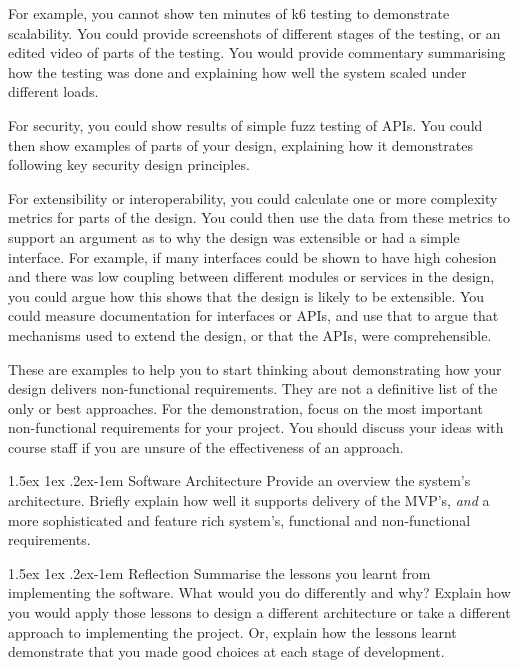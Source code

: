 \documentclass{csse4400}
\makeatletter
\renewcommand{\paragraph}{%
  \@startsection{paragraph}{4}%
  {\z@}{1.5ex \@plus 1ex \@minus .2ex}{-1em}%
  {\normalfont\normalsize\bfseries}%
}
\makeatother
\begin{document}
For example, you cannot show ten minutes of k6 testing to demonstrate scalability.
You could provide screenshots of different stages of the testing, or an edited video of parts of the testing.
You would provide commentary summarising how the testing was done and explaining how well the system scaled under different loads.

For security, you could show results of simple fuzz testing of APIs.
You could then show examples of parts of your design, explaining how it demonstrates following key security design principles.

For extensibility or interoperability, you could calculate one or more complexity metrics for parts of the design.
You could then use the data from these metrics to support an argument as to why the design was extensible or had a simple interface.
For example, if many interfaces could be shown to have high cohesion and there was low coupling between different modules
or services in the design, you could argue how this shows that the design is likely to be extensible.
You could measure documentation for interfaces or APIs,
and use that to argue that mechanisms used to extend the design, or that the APIs, were comprehensible.

These are examples to help you to start thinking about demonstrating how your design delivers non-functional requirements.
They are not a definitive list of the only or best approaches.
For the demonstration, focus on the most important non-functional requirements for your project.
You should discuss your ideas with course staff if you are unsure of the effectiveness of an approach.

\paragraph{Software Architecture} Provide an overview the system's architecture.
Briefly explain how well it supports delivery of the MVP's,
\textit{and} a more sophisticated and feature rich system's,
functional and non-functional requirements.

\paragraph{Reflection} Summarise the lessons you learnt from implementing the software.
What would you do differently and why?
Explain how you would apply those lessons to design a different architecture or take a different approach to implementing the project.
Or, explain how the lessons learnt demonstrate that you made good choices at each stage of development.
\end{document}
